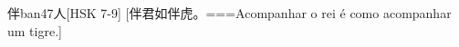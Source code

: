 \begin{EntryWithPhonetic}{伴}{ban4}{7}{⼈}[HSK 7-9]
  [伴君如伴虎。===Acompanhar o rei é como acompanhar um tigre.]
\end{EntryWithPhonetic}
